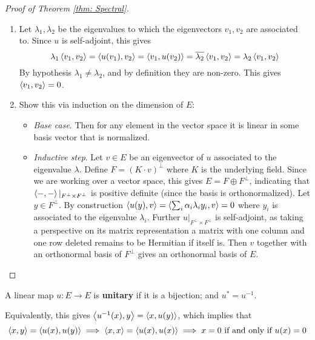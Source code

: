 \documentclass{article}
\begin{document}
\begin{proof}[Proof of Theorem \ref{thm: Spectral}]
\begin{enumerate}[label=\roman*)]
\begin{itemize}
            Now consider the corresponding map after the extension of scalar $i_{\C} := u \tensor \Id_{\C}$, which is given by the same matrix representation as that in $E$. By the result in the first case, this is self-adjoint; and since the characteristic polynomial of these two maps are the same, all roots are real numbers.
        \end{itemize}
        \item Let $\lambda_1, \lambda_2$ be the eigenvalues to which the eigenvectors $v_1, v_2$ are associated to. Since $u$ is self-adjoint, this gives
        \[
            \lambda_1 \left\langle v_1, v_2 \right\rangle = \left\langle u(v_1), v_2 \right\rangle = \left\langle v_1, u(v_2) \right\rangle = \overline{\lambda_2}\left\langle v_1, v_2 \right\rangle = \lambda_2 \left\langle v_1, v_2 \right\rangle
        \]
        By hypothesis $\lambda_1 \neq \lambda_2$, and by definition they are non-zero. This gives $\left\langle v_1, v_2 \right\rangle = 0$. 
        \item Show this via induction on the dimension of $E$:
        \begin{itemize}
            \item \emph{Base case}. Then for any element in the vector space it is linear in some basis vector that is normalized. 
            \item \emph{Inductive step}. Let $v \in E$ be an eigenvector of $u$ associated to the eigenvalue $\lambda$. Define $F = (K\cdot v)^{\perp}$ where $K$ is the underlying field. Since we are working over a vector space, this gives $E = F \oplus F^{\perp}$, indicating that $\left\langle -, - \right\rangle|_{F^{\perp} \times F^{\perp}}$ is positive definite (since the basis is orthonormalized). Let $y \in F^{\perp}$. By construction $\left\langle u(y), v \right\rangle = \left\langle \sum_{i} \alpha_i \lambda_i y_i, v \right\rangle = 0$ where $y_i$ is associated to the eigenvalue $\lambda_i$. Further $u|_{F^{\perp} \times F^{\perp}}$ is self-adjoint, as taking a perspective on its matrix representation a matrix with one column and one row deleted remains to be Hermitian if itself is. Then $v$ together with an orthonormal basis of $F^{\perp}$ gives an orthonormal basis of $E$. 
        \end{itemize}
    \end{enumerate}
\end{proof}

\begin{definition}
    A linear map $u: E \to E$ is \textbf{unitary} if it is a bijection; and $u^{\ast} = u^{-1}$.
\end{definition}

\begin{remark}\label{rmk: eq def of unitary}
    Equivalently, this gives $\left\langle u^{-1}(x), y \right\rangle = \left\langle x, u(y) \right\rangle$, which implies that
    \[
        \left\langle x, y \right\rangle = \left\langle u(x), u(y) \right\rangle \implies \left\langle x, x \right\rangle = \left\langle u(x), u(x) \right\rangle \implies x = 0 \text{ if and only if  } u(x) = 0
    \]
\end{remark}
\end{document}
